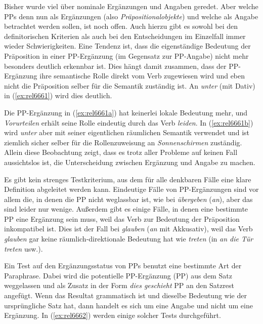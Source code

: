 \label{sec:ppergang}

Bisher wurde viel über nominale Ergänzungen und Angaben geredet.
Aber welche PPs denn nun als Ergänzungen (also \textit{Präpositionalobjekte}) und welche als Angabe betrachtet werden sollen, ist noch offen.
Auch hierzu gibt es sowohl bei den definitorischen Kriterien als auch bei den Entscheidungen im Einzelfall immer wieder Schwierigkeiten.
Eine Tendenz ist, dass die eigenständige Bedeutung der Präposition in einer PP-Ergänzung (im Gegensatz zur PP-Angabe) nicht mehr besonders deutlich erkennbar ist.
Dies hängt damit zusammen, dass der PP-Ergänzung ihre semantische Rolle direkt vom Verb zugewiesen wird und eben nicht die Präposition selber für die Semantik zuständig ist.
An \textit{unter} (mit Dativ) in (\ref{ex:rel6661}) wird dies deutlich.

\begin{exe}
  \ex\label{ex:rel6661} 
  \begin{xlist}
  \end{xlist}
\end{exe}

Die PP-Ergänzung in (\ref{ex:rel6661a}) hat keinerlei lokale Bedeutung mehr, und \textit{Vorurteilen} erhält seine Rolle eindeutig durch das Verb \textit{leiden}.
In (\ref{ex:rel6661b}) wird \textit{unter} aber mit seiner eigentlichen räumlichen Semantik verwendet und ist ziemlich sicher selber für die Rollenzuweisung an \textit{Sonnenschirmen} zuständig.
Allein diese Beobachtung zeigt, dass es trotz aller Probleme auf keinen Fall aussichtslos ist, die Unterscheidung zwischen Ergänzung und Angabe zu machen.

Es gibt kein strenges Testkriterium, aus dem für alle denkbaren Fälle eine klare Definition abgeleitet werden kann.
Eindeutige Fälle von PP-Ergänzungen sind vor allem die, in denen die PP nicht weglassbar ist, wie bei \textit{übergeben} (\textit{an}), aber das sind leider nur wenige.
Außerdem gibt es einige Fälle, in denen eine bestimmte PP eine Ergänzung sein muss, weil das Verb zur Bedeutung der Präposition inkompatibel ist.
Dies ist \zB der Fall bei \textit{glauben} (\textit{an} mit Akkusativ), weil das Verb \textit{glauben} gar keine räumlich-direktionale Bedeutung hat wie \zB \textit{treten} (in \textit{an die Tür treten} usw.).

Ein Test auf den Ergänzungsstatus von PPs benutzt eine bestimmte Art der Paraphrase.
Dabei wird die potentielle PP-Ergänzung (PP) aus dem Satz weggelassen und als Zusatz in der Form \textit{dies geschieht} PP an den Satzrest angefügt.
Wenn das Resultat grammatisch ist und dieselbe Bedeutung wie der ursprüngliche Satz hat, dann handelt es sich um eine Angabe und nicht um eine Ergänzung.
In (\ref{ex:rel6662}) werden einige solcher Tests durchgeführt.

